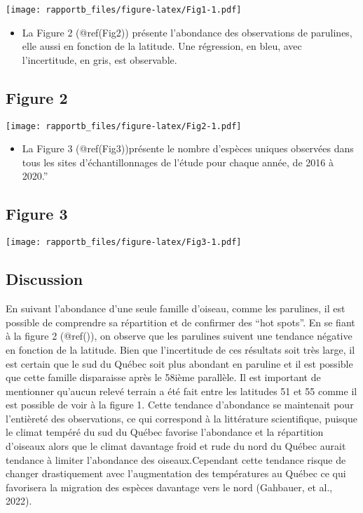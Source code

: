 \documentclass[
]{article}
\providecommand{\tightlist}{%
  \setlength{\itemsep}{0pt}\setlength{\parskip}{0pt}}
\begin{document}
\texttt{[image: rapportb\_files/figure-latex/Fig1-1.pdf]}

\begin{itemize}
\tightlist
\item
  La Figure 2 (@ref(Fig2)) présente l'abondance des observations de
  parulines, elle aussi en fonction de la latitude. Une régression, en
  bleu, avec l'incertitude, en gris, est observable.
\end{itemize}

\hypertarget{figure-2}{%
\subsection{Figure 2}\label{figure-2}}

\texttt{[image: rapportb\_files/figure-latex/Fig2-1.pdf]}

\begin{itemize}
\tightlist
\item
  La Figure 3 (@ref(Fig3))présente le nombre d'espèces uniques observées
  dans tous les sites d'échantillonnages de l'étude pour chaque année,
  de 2016 à 2020.''
\end{itemize}

\hypertarget{figure-3}{%
\subsection{Figure 3}\label{figure-3}}

\texttt{[image: rapportb\_files/figure-latex/Fig3-1.pdf]}

\hypertarget{discussion}{%
\subsection{Discussion}\label{discussion}}

En suivant l'abondance d'une seule famille d'oiseau, comme les
parulines, il est possible de comprendre sa répartition et de confirmer
des ``hot spots''. En se fiant à la figure 2 (@ref()), on observe que
les parulines suivent une tendance négative en fonction de la latitude.
Bien que l'incertitude de ces résultats soit très large, il est certain
que le sud du Québec soit plus abondant en paruline et il est possible
que cette famille disparaisse après le 58ième parallèle. Il est
important de mentionner qu'aucun relevé terrain a été fait entre les
latitudes 51 et 55 comme il est possible de voir à la figure 1. Cette
tendance d'abondance se maintenait pour l'entièreté des observations, ce
qui correspond à la littérature scientifique, puisque le climat tempéré
du sud du Québec favorise l'abondance et la répartition d'oiseaux alors
que le climat davantage froid et rude du nord du Québec aurait tendance
à limiter l'abondance des oiseaux.Cependant cette tendance risque de
changer drastiquement avec l'augmentation des températures au Québec ce
qui favorisera la migration des espèces davantage vers le nord
(Gahbauer, et al., 2022).
\end{document}
